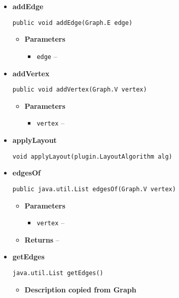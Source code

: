 {{{{{{{{{{{{{{\begin{itemize}
{\begin{itemize}
{Adds a new Edge to the graph
}
\end{itemize}
}%
\item{ 
{\bf  addEdge}\\
\begin{lstlisting}[frame=none]
public void addEdge(Graph.E edge)\end{lstlisting} %
\begin{itemize}
\item{
{\bf  Parameters}
  \begin{itemize}
   \item{
\texttt{edge} -- }
  \end{itemize}
}%
\end{itemize}
}%
\item{ 
{\bf  addVertex}\\
\begin{lstlisting}[frame=none]
public void addVertex(Graph.V vertex)\end{lstlisting} %
\begin{itemize}
\item{
{\bf  Parameters}
  \begin{itemize}
   \item{
\texttt{vertex} -- }
  \end{itemize}
}%
\end{itemize}
}%
\item{ 
{\bf  applyLayout}\\
\begin{lstlisting}[frame=none]
void applyLayout(plugin.LayoutAlgorithm alg)\end{lstlisting} %
}%
\item{ 
{\bf  edgesOf}\\
\begin{lstlisting}[frame=none]
public java.util.List edgesOf(Graph.V vertex)\end{lstlisting} %
\begin{itemize}
\item{
{\bf  Parameters}
  \begin{itemize}
   \item{
\texttt{vertex} -- }
  \end{itemize}
}%
\item{{\bf  Returns} -- 
 
}%
\end{itemize}
}%
\item{ 
{\bf  getEdges}\\
\begin{lstlisting}[frame=none]
java.util.List getEdges()\end{lstlisting} %
\begin{itemize}
\item{
{\bf  Description copied from Graph{\small {}} }

}
\end{itemize}}
\end{itemize}}}}}}}}}}}}}}}
